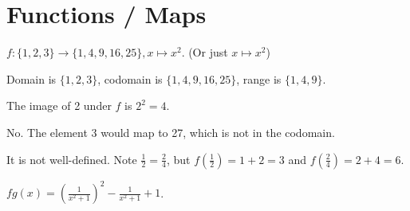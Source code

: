 \section{Functions / Maps}
\begin{questions}
    \item \begin{partquestions}{\roman*}
        \item $f: \{1, 2, 3\} \to \{1, 4, 9, 16, 25\}, x \mapsto x^2$. (Or just $x \mapsto x^2$)
        \item Domain is $\{1, 2, 3\}$, codomain is $\{1, 4, 9, 16, 25\}$, range is $\{1, 4, 9\}$.
        \item The image of 2 under $f$ is $2^2 = 4$.
        \item No. The element 3 would map to 27, which is not in the codomain.
    \end{partquestions}
    
    \item It is not well-defined. Note $\frac 12 = \frac 24$, but $f(\frac12) = 1 + 2 = 3$ and $f(\frac24) = 2 + 4 = 6$.
    
    \item $fg(x) = \left(\frac1{x^2+1}\right)^2 - \frac1{x^2+1} + 1$.
    

\end{questions}
